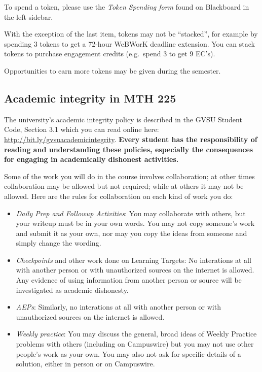 \documentclass[]{article}
\providecommand{\tightlist}{%
  \setlength{\itemsep}{0pt}\setlength{\parskip}{0pt}}
\begin{document}
To spend a token, please use the \emph{Token Spending form} found on
Blackboard in the left sidebar.

With the exception of the last item, tokens may not be ``stacked'', for
example by spending 3 tokens to get a 72-hour WeBWorK deadline
extension. You can stack tokens to purchase engagement credits
(e.g.~spend 3 to get 9 EC's).

Opportunities to earn more tokens may be given during the semester.

\hypertarget{academic-integrity-in-mth-225}{%
\subsection{Academic integrity in MTH
225}\label{academic-integrity-in-mth-225}}

The university's academic integrity policy is described in the GVSU
Student Code, Section 3.1 which you can read online here:
\url{http://bit.ly/gvsuacademicintegrity}. \textbf{Every student has the
responsibility of reading and understanding these policies, especially
the consequences for engaging in academically dishonest activities.}

Some of the work you will do in the course involves collaboration; at
other times collaboration may be allowed but not required; while at
others it may not be allowed. Here are the rules for collaboration on
each kind of work you do:

\begin{itemize}
\tightlist
\item
  \emph{Daily Prep and Followup Activities}: You may collaborate with
  others, but your writeup must be in your own words. You may not copy
  someone's work and submit it as your own, nor may you copy the ideas
  from someone and simply change the wording.
\item
  \emph{Checkpoints} and other work done on Learning Targets: No
  interations at all with another person or with unauthorized sources on
  the internet is allowed. Any evidence of using information from
  another person or source will be investigated as academic dishonesty.
\item
  \emph{AEPs}: Similarly, no interations at all with another person or
  with unauthorized sources on the internet is allowed.
\item
  \emph{Weekly practice}: You may discuss the general, broad ideas of
  Weekly Practice problems with others (including on Campuswire) but you
  may not use other people's work as your own. You may also not ask for
  specific details of a solution, either in person or on Campuswire.
\end{itemize}
\end{document}
